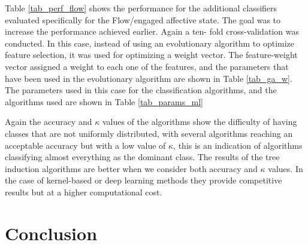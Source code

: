 \documentclass[a4paper,twoside]{article}
\begin{document}
Table \ref{tab_perf_flow} shows the performance for the additional classifiers
evaluated specifically for the Flow/engaged affective state. The goal was to
increase the performance achieved earlier. Again a ten-
fold cross-validation was conducted. In this case, instead of using an
evolutionary algorithm to optimize feature selection, it was used for 
optimizing a weight vector. 
      The feature-weight vector assigned a weight to each one of the
      features, and the parameters that have been used in the
      evolutionary algorithm are shown in Table \ref{tab_ga_w}.
%
      The parameters used in this case for the classification
      algorithms, and the algorithms used are shown in Table \ref{tab_params_ml}


Again the accuracy and $\kappa$ values of the
algorithms show the difficulty of having classes that are not uniformly
distributed, with several algorithms reaching an acceptable accuracy but with a
low value of  $\kappa$, this is an indication of algorithms classifying almost
everything as the dominant class. The results of the tree induction algorithms
are better when we consider both accuracy and  $\kappa$ values. In the case of
kernel-based or deep learning methods they provide competitive results but at a
higher computational cost.
 

\section{Conclusion}
\end{document}
